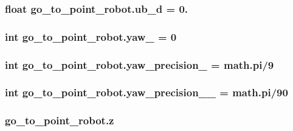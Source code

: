 \subsubsection[{\texorpdfstring{ub\+\_\+d}{ub_d}}]{\setlength{\rightskip}{0pt plus 5cm}float go\+\_\+to\+\_\+point\+\_\+robot.\+ub\+\_\+d = 0.}\hypertarget{namespacego__to__point__robot_aa54f25328ab1ea2787c879431057298f}{}\label{namespacego__to__point__robot_aa54f25328ab1ea2787c879431057298f}
\subsubsection[{\texorpdfstring{yaw\+\_\+}{yaw_}}]{\setlength{\rightskip}{0pt plus 5cm}int go\+\_\+to\+\_\+point\+\_\+robot.\+yaw\+\_\+ = 0}\hypertarget{namespacego__to__point__robot_af0544cdffc791a807b9062c979cf0c3d}{}\label{namespacego__to__point__robot_af0544cdffc791a807b9062c979cf0c3d}
\subsubsection[{\texorpdfstring{yaw\+\_\+precision\+\_\+}{yaw_precision_}}]{\setlength{\rightskip}{0pt plus 5cm}int go\+\_\+to\+\_\+point\+\_\+robot.\+yaw\+\_\+precision\+\_\+ = math.\+pi/9}\hypertarget{namespacego__to__point__robot_ad0131301589fb7d3d9462cff81932fcf}{}\label{namespacego__to__point__robot_ad0131301589fb7d3d9462cff81932fcf}
\subsubsection[{\texorpdfstring{yaw\+\_\+precision\+\_\+2\+\_\+}{yaw_precision_2_}}]{\setlength{\rightskip}{0pt plus 5cm}int go\+\_\+to\+\_\+point\+\_\+robot.\+yaw\+\_\+precision\+\_\+\_\+ = math.\+pi/90}\hypertarget{namespacego__to__point__robot_aadcca20dfdd8e843623186e6efde0481}{}\label{namespacego__to__point__robot_aadcca20dfdd8e843623186e6efde0481}
\subsubsection[{\texorpdfstring{z}{z}}]{\setlength{\rightskip}{0pt plus 5cm}go\+\_\+to\+\_\+point\+\_\+robot.\+z}\hypertarget{namespacego__to__point__robot_ad3b22a785c833ad2cdd10712a66f11c8}{}\label{namespacego__to__point__robot_ad3b22a785c833ad2cdd10712a66f11c8}

